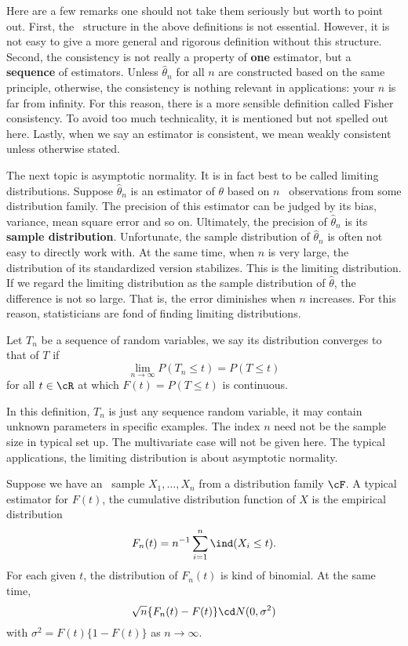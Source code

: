 Here are a few remarks one should not take them seriously but
worth to point out. First, the \iid\ structure in the above definitions
is not essential. However, it is not easy to give a more general and
rigorous definition without this structure.
Second, the consistency is not really a property of {\bf one} estimator,
but a {\bf sequence} of estimators. Unless $\hat \theta_n$ for all $n$
are constructed based on the same principle, otherwise, the consistency
is nothing relevant in applications: your $n$ is far from infinity.
For this reason, there is a more sensible definition called Fisher
consistency. To avoid too much technicality, it is mentioned but
not spelled out here.
Lastly, when we say an estimator is consistent, we mean weakly
consistent unless otherwise stated.

The next topic is asymptotic normality. It is in fact best to be called
limiting distributions. Suppose $\hat \theta_n$ is an estimator of
$\theta$ based on $n$ \iid\ observations from some distribution
family. The precision of this estimator can be judged by its bias,
variance, mean square error and so on. Ultimately, the precision
of $\hat \theta_n$ is its {\bf sample distribution}. Unfortunate, the
sample distribution of $\hat \theta_n$ is often not easy to directly
work with.
At the same time, when $n$ is very large, the distribution of its
standardized version stabilizes. This is the limiting distribution.
If we regard the limiting distribution as the sample distribution of
$\hat \theta$, the difference is not so large. That is, the error diminishes
when $n$ increases. For this reason, statisticians are fond of finding
limiting distributions.

\begin{defi}
Let $T_n$ be a sequence of random variables, we say its distribution
converges to that of $T$ if
\[
\lim_{n \to \infty} P(T_n \leq t) = P(T\leq t)
\]
for all $t \in \cR$ at which $F(t) = P(T \leq t)$  is continuous.
\end{defi}

In this definition, $T_n$ is just any sequence random variable, it may
contain unknown parameters in specific examples. The index
$n$ need not be the sample size in typical set up. The multivariate
case will not be given here.
The typical applications, the limiting distribution
is about asymptotic normality.

\begin{example}
Suppose we have an \iid\ sample $X_1, \ldots, X_n$ from a
distribution family $\cF$. A typical estimator for $F(t)$, the
cumulative distribution function of $X$ is the
empirical distribution
\[
F_n(t) = n^{-1} \sum_{i=1}^n \ind(X_i \leq t).
\]
For each given $t$, the distribution of $F_n(t)$ is kind of binomial.
At the same time,
\[
\sqrt{n} \{ F_n(t) - F(t) \} \cd N(0, \sigma^2)
\]
with $\sigma^2 = F(t) \{ 1 - F(t)\}$ as $n \to \infty$. 
\end{example}

